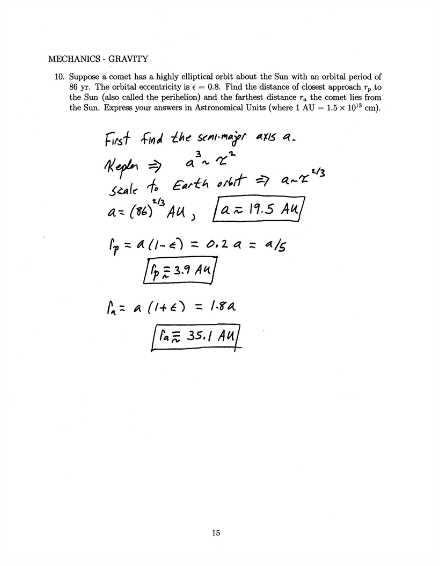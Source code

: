 \documentclass[10pt,a4paper]{article}
\begin{document}
\begin{figure}[H]
 \centering
 \includegraphics[width=16cm]{pdf/1-1T34.png}
\end{figure}
 \newpage
\end{document}
